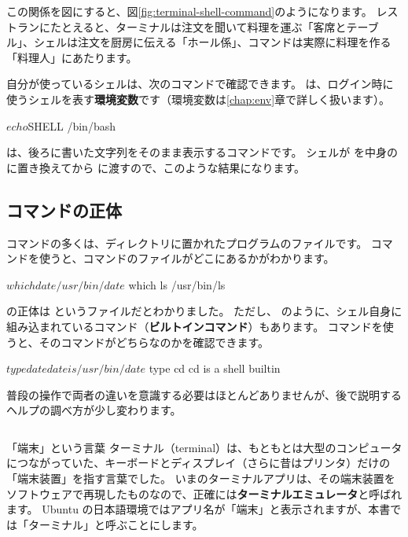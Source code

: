 この関係を図にすると、図\ref{fig:terminal-shell-command}のようになります。
レストランにたとえると、ターミナルは注文を聞いて料理を運ぶ「客席とテーブル」、シェルは注文を厨房に伝える「ホール係」、コマンドは実際に料理を作る「料理人」にあたります。

自分が使っているシェルは、次のコマンドで確認できます。
 は、ログイン時に使うシェルを表す\textbf{環境変数}です（環境変数は\ref{chap:env}章で詳しく扱います）。

\begin{terminal}[使っているシェルを確認する]
$ echo $SHELL
/bin/bash
\end{terminal}

 は、後ろに書いた文字列をそのまま表示するコマンドです。
シェルが  を中身の  に置き換えてから  に渡すので、このような結果になります。

\subsection{コマンドの正体}

コマンドの多くは、ディレクトリに置かれたプログラムのファイルです。
 コマンドを使うと、コマンドのファイルがどこにあるかがわかります。

\begin{terminal}[コマンドのファイルの場所を調べる]
$ which date
/usr/bin/date
$ which ls
/usr/bin/ls
\end{terminal}

 の正体は  というファイルだとわかりました。
ただし、 のように、シェル自身に組み込まれているコマンド（\textbf{ビルトインコマンド}）もあります。
 コマンドを使うと、そのコマンドがどちらなのかを確認できます。

\begin{terminal}[コマンドの種類を調べる]
$ type date
date is /usr/bin/date
$ type cd
cd is a shell builtin
\end{terminal}

普段の操作で両者の違いを意識する必要はほとんどありませんが、後で説明するヘルプの調べ方が少し変わります。

\begin{column}{「端末」という言葉}
  ターミナル（terminal）は、もともとは大型のコンピュータにつながっていた、キーボードとディスプレイ（さらに昔はプリンタ）だけの「端末装置」を指す言葉でした。
  いまのターミナルアプリは、その端末装置をソフトウェアで再現したものなので、正確には\textbf{ターミナルエミュレータ}と呼ばれます。
  Ubuntu の日本語環境ではアプリ名が「端末」と表示されますが、本書では「ターミナル」と呼ぶことにします。
\end{column}

